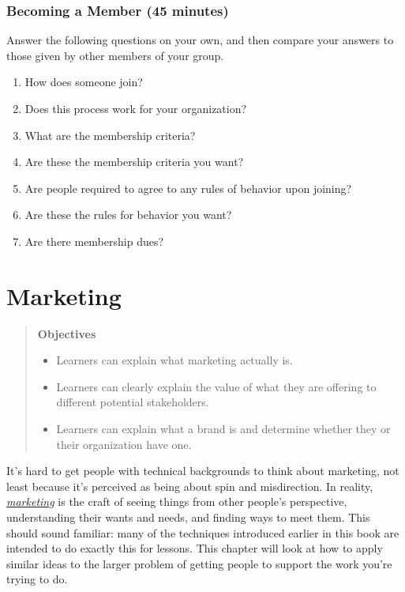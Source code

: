 \documentclass[10pt,statementpaper]{memoir}
\providecommand{\tightlist}{%
  \setlength{\itemsep}{0pt}\setlength{\parskip}{0pt}}
\begin{document}
\subsection{Becoming a Member (45
minutes)}\label{becoming-a-member-45-minutes}

Answer the following questions on your own, and then compare your
answers to those given by other members of your group.

\begin{enumerate}
\def\labelenumi{\arabic{enumi}.}
\tightlist
\item
  How does someone join?
\item
  Does this process work for your organization?
\item
  What are the membership criteria?
\item
  Are these the membership criteria you want?
\item
  Are people required to agree to any rules of behavior upon joining?
\item
  Are these the rules for behavior you want?
\item
  Are there membership dues?
\end{enumerate}

\chapter{Marketing}\label{marketing}

\begin{quote}
\textbf{Objectives}

\begin{itemize}
\tightlist
\item
  Learners can explain what marketing actually is.
\item
  Learners can clearly explain the value of what they are offering to
  different potential stakeholders.
\item
  Learners can explain what a brand is and determine whether they or
  their organization have one.
\end{itemize}
\end{quote}

It's hard to get people with technical backgrounds to think about
marketing, not least because it's perceived as being about spin and
misdirection. In reality, \emph{\href{gloss.html\#marketing}{marketing}}
is the craft of seeing things from other people's perspective,
understanding their wants and needs, and finding ways to meet them. This
should sound familiar: many of the techniques introduced earlier in this
book are intended to do exactly this for lessons. This chapter will look
at how to apply similar ideas to the larger problem of getting people to
support the work you're trying to do.
\end{document}
